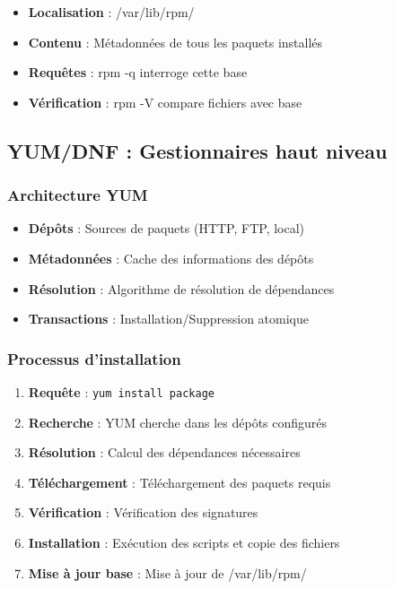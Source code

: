 \documentclass[12pt,a4paper]{article}
\begin{document}
\begin{itemize}
    \item \textbf{Localisation} : /var/lib/rpm/
    \item \textbf{Contenu} : Métadonnées de tous les paquets installés
    \item \textbf{Requêtes} : rpm -q interroge cette base
    \item \textbf{Vérification} : rpm -V compare fichiers avec base
\end{itemize}

\subsection{YUM/DNF : Gestionnaires haut niveau}

\subsubsection{Architecture YUM}

\begin{itemize}
    \item \textbf{Dépôts} : Sources de paquets (HTTP, FTP, local)
    \item \textbf{Métadonnées} : Cache des informations des dépôts
    \item \textbf{Résolution} : Algorithme de résolution de dépendances
    \item \textbf{Transactions} : Installation/Suppression atomique
\end{itemize}

\subsubsection{Processus d'installation}

\begin{enumerate}
    \item \textbf{Requête} : \texttt{yum install package}
    \item \textbf{Recherche} : YUM cherche dans les dépôts configurés
    \item \textbf{Résolution} : Calcul des dépendances nécessaires
    \item \textbf{Téléchargement} : Téléchargement des paquets requis
    \item \textbf{Vérification} : Vérification des signatures
    \item \textbf{Installation} : Exécution des scripts et copie des fichiers
    \item \textbf{Mise à jour base} : Mise à jour de /var/lib/rpm/
\end{enumerate}
\end{document}
